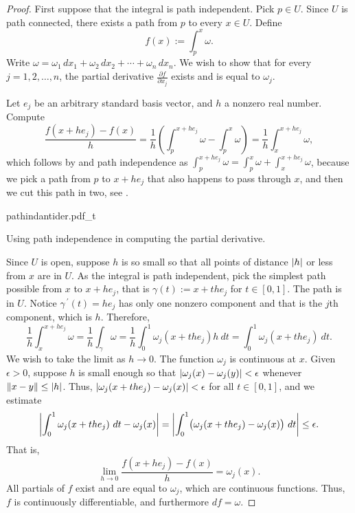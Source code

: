 \begin{proof}
First suppose that the integral is path independent.  Pick $p \in U$.  Since
$U$ is path connected, there exists a path from $p$ to every $x \in U$.
Define
\begin{equation*}
f(x) := \int_{p}^x \omega .
\end{equation*}
Write $\omega = \omega_1 \,dx_1 + \omega_2 \,dx_2 + \cdots + \omega_n \,dx_n$.
We wish to show that for every $j = 1,2,\ldots,n$, the
partial derivative $\frac{\partial f}{\partial x_j}$ exists
and is equal to $\omega_j$.

Let $e_j$ be an arbitrary standard basis vector, and $h$ a nonzero real
number.  Compute
\begin{equation*}
\frac{f(x+h e_j) - f(x)}{h} =
\frac{1}{h} \left( \int_{p}^{x+he_j} \omega - \int_{p}^x \omega \right)
=
\frac{1}{h} \int_{x}^{x+he_j} \omega ,
\end{equation*}
which follows by  and path independence as 
$\int_{p}^{x+he_j} \omega =
\int_{p}^{x} \omega +
\int_{x}^{x+he_j} \omega$, because we pick a path from $p$ to
$x+he_j$ that also happens to pass through $x$, and then we cut this path in
two, see .

\begin{myfigureht}
{pathindantider.pdf_t}
\caption{Using path independence in computing the partial
derivative.\label{fig:pathindantider}}
\end{myfigureht}


Since $U$ is open, suppose $h$ is so small so that all points of distance
$\left\lvert {h} \right\rvert$ or
less from $x$ are in $U$.
As the integral is path independent,
pick the simplest path possible from $x$ to $x+he_j$, that is
$\gamma(t) := x+t he_j$ for $t \in [0,1]$.  The path is in $U$.
Notice $\gamma^{\:\prime}(t) = h e_j$
has only one nonzero component and that is the $j$th component, which is
$h$.  Therefore,
\begin{equation*}
\frac{1}{h} \int_{x}^{x+he_j} \omega 
=
\frac{1}{h} \int_{\gamma} \omega 
=
\frac{1}{h} \int_0^1 \omega_j(x+the_j) h ~ dt 
=
\int_0^1 \omega_j(x+the_j) ~ dt  .
\end{equation*}
We wish to take the limit as $h \to 0$.  The function $\omega_j$ is
continuous at $x$.  Given $\epsilon > 0$, suppose $h$ is small enough so that
$\left\lvert {\omega_j(x)-\omega_j(y)} \right\rvert < \epsilon$ whenever $\lVert {x-y} \rVert \leq \left\lvert {h} \right\rvert$.
Thus,
$\left\lvert {\omega_j(x+the_j)-\omega_j(x)} \right\rvert < \epsilon$ for all $t \in [0,1]$,
and we estimate
\begin{equation*}
\left\lvert {\int_0^1 \omega_j(x+the_j) ~ dt  - \omega_j(x)} \right\rvert
=
\left\lvert {\int_0^1 \bigl( \omega_j(x+the_j) - \omega_j(x) \bigr) ~ dt} \right\rvert
\leq
\epsilon .
\end{equation*}
That is,
\begin{equation*}
\lim_{h\to 0}\frac{f(x+h e_j) - f(x)}{h} = \omega_j(x) .
\end{equation*}
All partials of $f$ exist and are equal to $\omega_j$, which are continuous
functions.  Thus, $f$ is continuously differentiable, and furthermore
$df = \omega$.


\end{proof}

